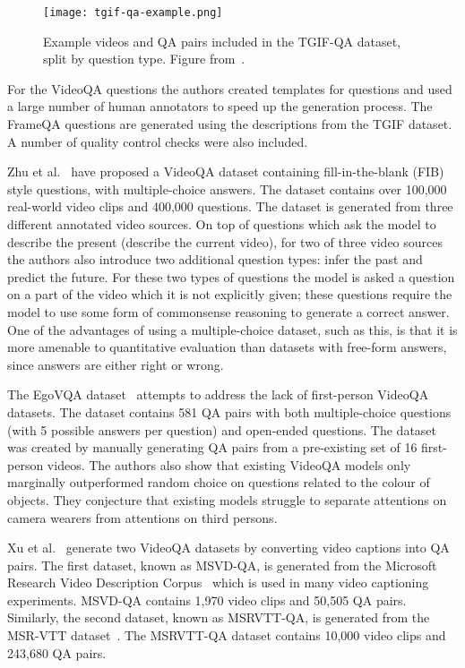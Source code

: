 \documentclass[../interim.tex]{subfiles}
\begin{document}
\begin{figure}
  \centering
  \texttt{[image: tgif-qa-example.png]}
  \caption{Example videos and QA pairs included in the TGIF-QA dataset, split by question type. Figure from~\cite{dataset:tgif-qa}.}
  \label{fig:tgif-examples}
\end{figure}

For the VideoQA questions the authors created templates for questions and used a large number of human annotators to speed up the generation process. The FrameQA questions are generated using the descriptions from the TGIF dataset. A number of quality control checks were also included.

Zhu et al.~\cite{dataset:zhu} have proposed a VideoQA dataset containing fill-in-the-blank (FIB) style questions, with multiple-choice answers. The dataset contains over 100,000 real-world video clips and 400,000 questions. The dataset is generated from three different annotated video sources. On top of questions which ask the model to describe the present (describe the current video), for two of three video sources the authors also introduce two additional question types: infer the past and predict the future. For these two types of questions the model is asked a question on a part of the video which it is not explicitly given; these questions require the model to use some form of commonsense reasoning to generate a correct answer. One of the advantages of using a multiple-choice dataset, such as this, is that it is more amenable to quantitative evaluation than datasets with free-form answers, since answers are either right or wrong.

The EgoVQA dataset~\cite{dataset:ego-vqa} attempts to address the lack of first-person VideoQA datasets. The dataset contains 581 QA pairs with both multiple-choice questions (with 5 possible answers per question) and open-ended questions. The dataset was created by manually generating QA pairs from a pre-existing set of 16 first-person videos. The authors also show that existing VideoQA models only marginally outperformed random choice on questions related to the colour of objects. They conjecture that existing models struggle to separate attentions on camera wearers from attentions on third persons.

Xu et al.~\cite{dataset:xu} generate two VideoQA datasets by converting video captions into QA pairs. The first dataset, known as MSVD-QA, is generated from the Microsoft Research Video Description Corpus~\cite{dataset:msvd} which is used in many video captioning experiments. MSVD-QA contains 1,970 video clips and 50,505 QA pairs. Similarly, the second dataset, known as MSRVTT-QA, is generated from the MSR-VTT dataset~\cite{dataset:msr-vtt}. The MSRVTT-QA dataset contains 10,000 video clips and 243,680 QA pairs.
\end{document}
